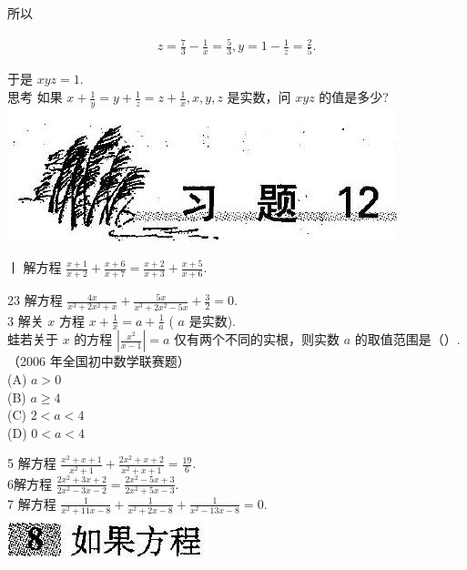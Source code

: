 \documentclass[10pt]{article}
\begin{document}
所以

\begin{align*}
z=\frac{7}{3}-\frac{1}{x}=\frac{5}{3}, y=1-\frac{1}{z}=\frac{2}{5} .
\end{align*}

于是 $x y z=1$.\\
思考 如果 $x+\frac{1}{y}=y+\frac{1}{z}=z+\frac{1}{x}, x, y, z$ 是实数，问 $x y z$ 的值是多少?\\
\includegraphics[max width=\textwidth, center]{2024_10_30_26b590fd1106d28139f0g-078}

ㅣ 解方程 $\frac{x+1}{x+2}+\frac{x+6}{x+7}=\frac{x+2}{x+3}+\frac{x+5}{x+6}$.

23 解方程 $\frac{4 x}{x^{3}+2 x^{2}+x}+\frac{5 x}{x^{3}+2 x^{2}-5 x}+\frac{3}{2}=0$.\\
3 解关 $x$ 方程 $x+\frac{1}{x}=a+\frac{1}{a}$ ( $a$ 是实数).\\
蛙若关于 $x$ 的方程 $\left|\frac{x^{2}}{x-1}\right|=a$ 仅有两个不同的实根，则实数 $a$ 的取值范围是（）.（2006 年全国初中数学联赛题）\\
(A) $a>0$\\
(B) $a \geqslant 4$\\
(C) $2<a<4$\\
(D) $0<a<4$

5 解方程 $\frac{x^{2}+x+1}{x^{2}+1}+\frac{2 x^{2}+x+2}{x^{2}+x+1}=\frac{19}{6}$.\\
6解方程 $\frac{2 x^{2}+3 x+2}{2 x^{2}-3 x-2}=\frac{2 x^{2}-5 x+3}{2 x^{2}+5 x-3}$.\\
7 解方程 $\frac{1}{x^{2}+11 x-8}+\frac{1}{x^{2}+2 x-8}+\frac{1}{x^{2}-13 x-8}=0$.\\
\includegraphics[max width=\textwidth, center]{2024_10_30_26b590fd1106d28139f0g-079}
\end{document}
